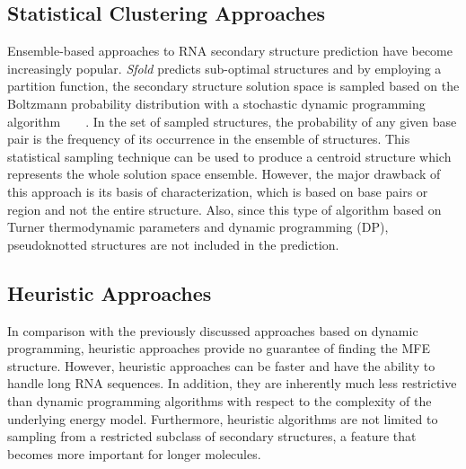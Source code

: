 \documentclass{doublecol-new}
\theoremstyle{TH}{
\newtheorem{lemma}{Lemma}
\newtheorem{theorem}[lemma]{Theorem}
\newtheorem{corrolary}[lemma]{Corrolary}
\newtheorem{conjecture}[lemma]{Conjecture}
\newtheorem{proposition}[lemma]{Proposition}
\newtheorem{claim}[lemma]{Claim}
\newtheorem{stheorem}[lemma]{Wrong Theorem}
\newtheorem{algorithm}{Algorithm}
}
\theoremstyle{THrm}{
\newtheorem{definition}{Definition}
\newtheorem{question}{Question}
\newtheorem{remark}{Remark}
\newtheorem{scheme}{Scheme}
}
\theoremstyle{THhit}{
\newtheorem{case}{Case}[section]
}
\begin{document}
\subsection{Statistical Clustering Approaches}
Ensemble-based approaches to RNA secondary structure prediction have become increasingly
popular.
{\em Sfold} predicts sub-optimal
structures and by employing a partition function, the secondary structure solution
space is sampled based on the Boltzmann probability distribution with a
stochastic dynamic programming algorithm~\cite{ding_2005}~\cite{ding_2003}~\cite{ding_2005b}~\cite{Aghaeepour_2013}.
In the set of sampled structures,
the probability of any given base pair is the frequency of its occurrence
in the ensemble of structures. This statistical sampling technique can
be used to produce a centroid structure which represents the whole solution
space ensemble. However, the major drawback of this approach is its basis of
characterization, which is based on base pairs or region and not the
entire structure. Also, since this type of algorithm based on Turner
thermodynamic parameters and dynamic programming (DP), pseudoknotted structures are not included
in the prediction.

\subsection{Heuristic Approaches}
In comparison with the previously discussed approaches based on
dynamic programming, heuristic approaches provide no guarantee of
finding the MFE structure. However, heuristic approaches can be
faster and have the ability to handle long RNA sequences. In
addition, they are inherently much less restrictive than  dynamic
programming algorithms with respect to the complexity of the
underlying energy model. Furthermore, heuristic algorithms are not
limited to sampling from a restricted subclass of secondary
structures, a feature that becomes more important for longer
molecules.

\end{document}
